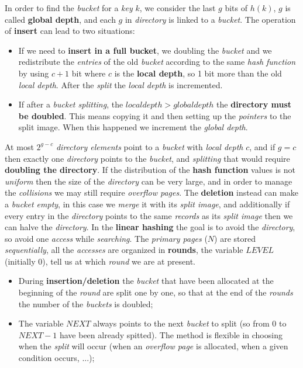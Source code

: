 \documentclass{article}
\begin{document}
In order to find the \emph{bucket} for a \emph{key} $k$, we consider the last $g$ bits of $h(k)$, $g$ is called \textbf{global depth}, and each $g$ in \emph{directory} is linked to a \emph{bucket}. The operation of \textbf{insert} can lead to two situations:
\begin{itemize}
\item If we need to \textbf{insert in a full bucket}, we doubling the \emph{bucket} and we redistribute the \emph{entries} of the old \emph{bucket} according to the same \emph{hash function} by using $c+1$ bit where $c$ is the \textbf{local depth}, so 1 bit more than the old \emph{local depth}. After the \emph{split} the \emph{local depth} is incremented.
\item If after a \emph{bucket splitting}, the $local depth > global depth$ the \textbf{directory must be doubled}. This means copying it and then setting up the \emph{pointers} to the split image. When this happened we increment the \emph{global depth}.
\end{itemize}
At most $2^{g-c}$ \emph{directory elements} point to a \emph{bucket} with \emph{local depth} $c$, and if $g=c$ then exactly one \emph{directory} points to the \emph{bucket}, and \emph{splitting} that would require \textbf{doubling the directory}. If the distribution of the \textbf{hash function} values is not \emph{uniform} then the size of the \emph{directory} can be very large, and in order to manage the \emph{collisions} we may still require \emph{overflow pages}. The \textbf{deletion} instead can make a \emph{bucket empty}, in this case we \emph{merge} it with its \emph{split image}, and additionally if every entry in the \emph{directory} points to the same \emph{records} as its \emph{split image} then we can halve the \emph{directory}. \clearpage
In the \textbf{linear hashing} the goal is to avoid the \emph{directory}, so avoid one \emph{access} while \emph{searching}. The \emph{primary pages} ($N$) are stored \emph{sequentially}, all the \emph{accesses} are organized in \textbf{rounds}, the variable $LEVEL$ (initially 0), tell us at which \emph{round} we are at present. 
\begin{itemize}
\item During \textbf{insertion/deletion} the \emph{bucket} that have been allocated at the beginning of the \emph{round} are split one by one, so that at the end of the \emph{rounds} the number of the \emph{buckets} is doubled;
\item The variable $NEXT$ always points to the next \emph{bucket} to split (so from 0 to $NEXT-1$ have been already spitted). The method is flexible in choosing when the \emph{split} will occur (when an \emph{overflow page} is allocated, when a given condition occurs, ...);
\end{itemize}
\end{document}
